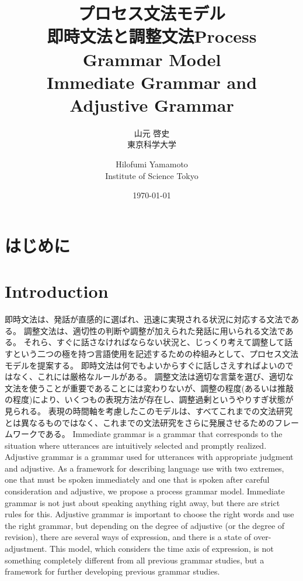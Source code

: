 \documentclass[a4paper,xelatex,ja=standard]{bxjsarticle}
\title{プロセス文法モデル\\即時文法と調整文法}
\author{
  山元 啓史\\東京科学大学
}
\title{Process Grammar Model\\Immediate Grammar and Adjustive Grammar}
\author{
Hilofumi Yamamoto\\Institute of Science Tokyo
}
\date{\today}
\begin{document}
\maketitle



\ifJPN
\section{はじめに}
\else
\section{Introduction}
\fi

\ifJPN
即時文法は、発話が直感的に選ばれ、迅速に実現される状況に対応する文法である。
調整文法は、適切性の判断や調整が加えられた発話に用いられる文法である。
それら、すぐに話さなければならない状況と、じっくり考えて調整して話すという二つの極を持つ言語使用を記述するための枠組みとして、プロセス文法モデルを提案する。
即時文法は何でもよいからすぐに話しさえすればよいのではなく、これには厳格なルールがある。
調整文法は適切な言葉を選び、適切な文法を使うことが重要であることには変わりないが、調整の程度(あるいは推敲の程度)により、いくつもの表現方法が存在し、調整過剰というやりすぎ状態が見られる。
表現の時間軸を考慮したこのモデルは、すべてこれまでの文法研究とは異なるものではなく、これまでの文法研究をさらに発展させるためのフレームワークである。
\else
Immediate grammar is a grammar that corresponds to the situation where utterances are intuitively selected and promptly realized.
Adjustive grammar is a grammar used for utterances with appropriate judgment and adjustive.
As a framework for describing language use with two extremes, one that must be spoken immediately and one that is spoken after careful consideration and adjustive, we propose a process grammar model.
Immediate grammar is not just about speaking anything right away, but there are strict rules for this.
Adjustive grammar is important to choose the right words and use the right grammar, but depending on the degree of adjustive (or the degree of revision), there are several ways of expression, and there is a state of over-adjustment.
This model, which considers the time axis of expression, is not something completely different from all previous grammar studies, but a framework for further developing previous grammar studies.
\fi
\end{document}
